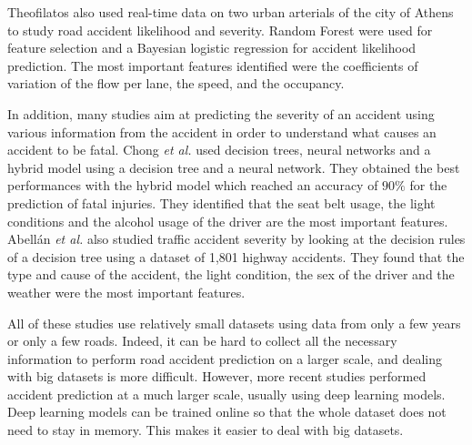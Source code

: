 \documentclass[conference]{IEEEtran}
\begin{document}
Theofilatos\cite{Theofilatos2017} also used
real-time data on two urban arterials of the city of Athens to study road
accident likelihood and severity. Random Forest were used for feature
selection and a Bayesian logistic regression for accident likelihood
prediction. The most important features identified were the coefficients of
variation of the flow per lane, the speed, and the occupancy.

In addition, many
studies aim at predicting the severity of an accident using various
information from the accident in order to understand what causes an
accident to be fatal. Chong \textit{et al.} \cite{Chong2005} used decision trees,
neural networks and a hybrid model using a decision tree and a neural
network. They obtained the best performances with the hybrid model which
reached an accuracy of $90\%$ for the prediction of fatal injuries. They
identified that the seat belt usage, the light conditions and the alcohol
usage of the driver are the most important features. Abellán \textit{et al.}
\cite{Abellan2013} also studied traffic accident severity by looking at the
decision rules of a decision tree using a dataset of 1,801 highway
accidents. They found that the type and cause of the accident, the light
condition, the sex of the driver and the weather were the most important
features.

All of these studies use relatively small datasets using data from only a
few years or only a few roads. Indeed, it can be hard to collect all the
necessary information to perform road accident prediction on a larger
scale, and dealing with big datasets is more difficult. However, more
recent studies \cite{QChen2016, Najjar2017, Yuan2018} performed accident prediction at a much larger scale,
usually using deep learning models. Deep learning models can be trained
online so that the whole dataset does not need to stay in memory. This
makes it easier to deal with big datasets.
\end{document}
